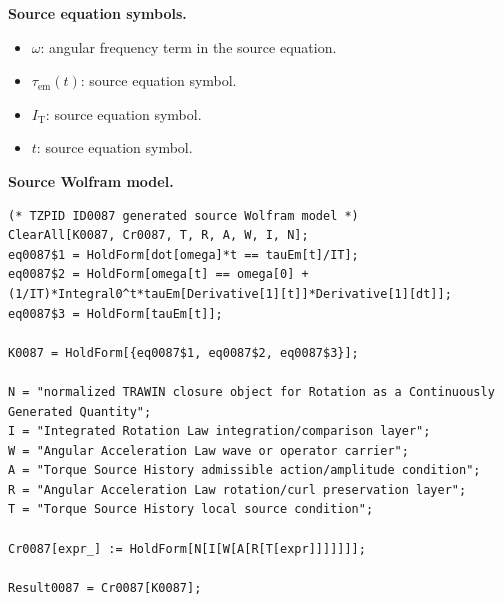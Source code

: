 \begin{minipage}[t]{0.49\linewidth}
\begingroup
\small
\raggedright
\textbf{Source equation symbols.}\par
\begin{itemize}[leftmargin=1.35em,itemsep=1pt,topsep=1pt,parsep=0pt]
    \item $\omega$: angular frequency term in the source equation.
    \item $\tau_{\mathrm{em}}(t)$: source equation symbol.
    \item $I_{\mathrm{T}}$: source equation symbol.
    \item $t$: source equation symbol.
\end{itemize}
\endgroup
\end{minipage}\hfill
\begin{minipage}[t]{0.47\linewidth}
\begingroup
\scriptsize
\raggedright
\textbf{Source Wolfram model.}\par
\begin{Verbatim}[fontsize=\tiny,breaklines=true,breakanywhere=true]
(* TZPID ID0087 generated source Wolfram model *)
ClearAll[K0087, Cr0087, T, R, A, W, I, N];
eq0087$1 = HoldForm[dot[omega]*t == tauEm[t]/IT];
eq0087$2 = HoldForm[omega[t] == omega[0] + (1/IT)*Integral0^t*tauEm[Derivative[1][t]]*Derivative[1][dt]];
eq0087$3 = HoldForm[tauEm[t]];

K0087 = HoldForm[{eq0087$1, eq0087$2, eq0087$3}];

N = "normalized TRAWIN closure object for Rotation as a Continuously Generated Quantity";
I = "Integrated Rotation Law integration/comparison layer";
W = "Angular Acceleration Law wave or operator carrier";
A = "Torque Source History admissible action/amplitude condition";
R = "Angular Acceleration Law rotation/curl preservation layer";
T = "Torque Source History local source condition";

Cr0087[expr_] := HoldForm[N[I[W[A[R[T[expr]]]]]]];

Result0087 = Cr0087[K0087];
\end{Verbatim}
\endgroup
\end{minipage}

